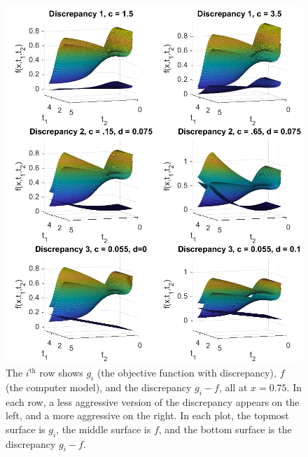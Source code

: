 \documentclass[12pt]{article}
\begin{document}
\begin{figure}
\centering
\includegraphics[scale=0.85]{FIG_six_discrepancies}
\captionsetup{width=.85\linewidth}
\caption{The $i^{\text{th}}$ row shows $g_i$ (the objective function with discrepancy), $f$ (the computer model), and the discrepancy $g_i-f$, all at $x=0.75$. In each row, a less aggressive version of the discrepancy appears on the left, and a more aggressive on the right. In each plot, the topmost surface is $g_i$, the middle surface is $f$, and the bottom surface is the discrepancy $g_i-f$.}
\label{fig:discrepancies}
\end{figure}
%
\end{document}
